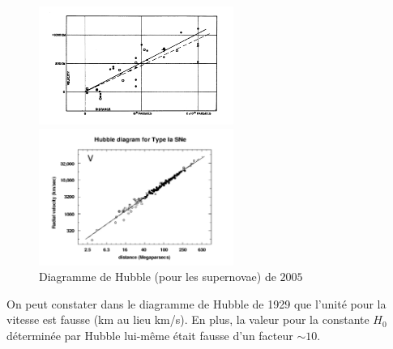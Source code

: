 \documentclass[a4paper,12pt]{report}
\theoremstyle{plain}
\theoremstyle{plain}
\begin{document}
      	 \begin{figure}[h]
\begin{minipage}{14pc}
\includegraphics[width=15pc]{t3.png}
\caption{Diagramme publi\'e par Edwin
Hubble dans son article de $1929$ \cite{1}}
\end{minipage}\hspace{3pc}%
\begin{minipage}{14pc}
\includegraphics[width=15pc]{t4.png}
 \caption{Diagramme de Hubble (pour
les supernovae) de $2005$ \cite{2}}
 \end{minipage}\hspace{3pc}%
\end{figure}
      	
      	
      	On peut constater dans le diagramme de Hubble de 1929 que l'unit\'e pour la vitesse est fausse (km au lieu km/s). En plus, la valeur pour la constante $H_0$ d\'etermin\'ee par Hubble lui-m\^{e}me \'etait fausse d'un facteur $\sim 10$.
      	
\end{document}
